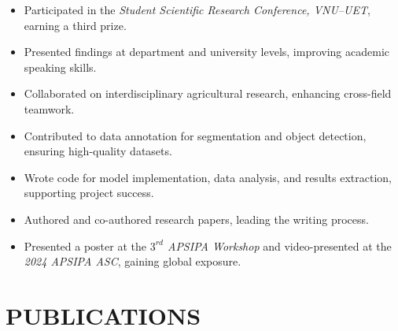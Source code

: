 \documentclass[a4paper,9pt]{extarticle}
\begin{document}
\begin{itemize}
    \item Participated in the \textit{Student Scientific Research Conference, VNU--UET}, earning a third prize.
    \item Presented findings at department and university levels, improving academic speaking skills.
    \item Collaborated on interdisciplinary agricultural research, enhancing cross-field teamwork.
    \item Contributed to data annotation for segmentation and object detection, ensuring high-quality datasets.
    \item Wrote code for model implementation, data analysis, and results extraction, supporting project success.
    \item Authored and co-authored research papers, leading the writing process.
    \item Presented a poster at the \textit{\(3^{rd}\) APSIPA Workshop} and video-presented at the \textit{2024 APSIPA ASC}, gaining global exposure.
\end{itemize}



\section*{PUBLICATIONS}
\end{document}
